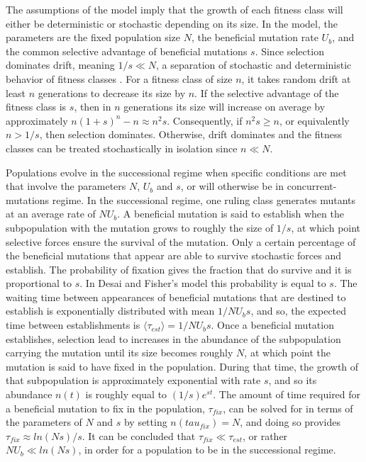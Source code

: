 \documentclass[12pt, one column]{article}
\begin{document}
The assumptions of the model imply that the growth of each fitness class will either be deterministic or stochastic depending on its size.  In the model, the parameters are the fixed population size $N$, the beneficial mutation rate $U_b$, and the common selective advantage of beneficial mutations $s$.  Since selection dominates drift, meaning $1/s \ll N$, a separation of stochastic and deterministic behavior of fitness classes .  For a fitness class of size $n$, it takes random drift at least $n$ generations to decrease its size by $n$.  If the selective advantage of the fitness class is $s$, then in $n$ generations its size will increase on average by approximately $n(1+s)^n-n \approx n^2s$.  Consequently, if $n^2s \ge n$, or equivalently $n>1/s$, then selection dominates.  Otherwise, drift dominates and the fitness classes can be treated stochastically in isolation since $n \ll N$.  

Populations evolve in the successional regime when specific conditions are met that involve the parameters $N$, $U_b$ and $s$, or will otherwise be in concurrent-mutations regime.  In the successional regime, one ruling class generates mutants at an average rate of $N U_b$.  A beneficial mutation is said to establish when the subpopulation with the mutation grows to roughly the size of $1/s$, at which point selective forces ensure the survival of the mutation.  Only a certain percentage of the beneficial mutations that appear are able to survive stochastic forces and establish.  The probability of fixation gives the fraction that do survive and it is proportional to $s$.  In Desai and Fisher's model this probability is equal to $s$.  The waiting time between appearances of beneficial mutations that are destined to establish is exponentially distributed with mean $1/NU_b s$, and so, the expected time between establishments is $\langle \tau_{est} \rangle = 1/NU_b s$.  Once a beneficial mutation establishes, selection lead to increases in the abundance of the subpopulation carrying the mutation until its size becomes roughly $N$, at which point the mutation is said to have fixed in the population.  During that time, the growth of that subpopulation is approximately exponential with rate $s$, and so its abundance $n(t)$ is roughly equal to $(1/s) e^{st}$.  The amount of time required for a beneficial mutation to fix in the population, $\tau_{fix}$, can be solved for in terms of the parameters of $N$ and $s$ by setting $n(tau_{fix})=N$, and doing so provides $\tau_{fix} \approx ln(Ns)/s$.  It can be concluded that $\tau_{fix} \ll \tau_{est}$, or rather $N U_b \ll ln(Ns)$, in order for a population to be in the successional regime. 
\end{document}
